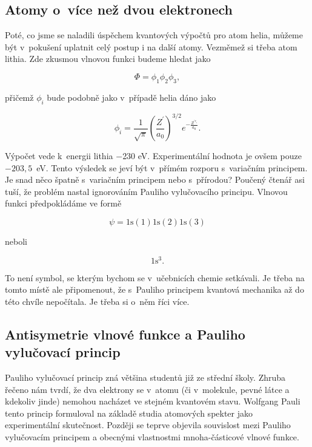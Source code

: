 \subsection{Atomy o~více než dvou elektronech}
Poté, co jsme se naladili úspěchem kvantových výpočtů pro atom helia, můžeme být v~pokušení uplatnit celý postup i na další atomy. Vezměmež si třeba atom lithia. Zde zkusmou vlnovou funkci budeme hledat jako

\begin{equation}
\Phi = \phi_1 \phi_2 \phi_3,
\label{rov:VE-22}
\end{equation}

\noindent přičemž $\phi_i$ bude podobně jako v~případě helia dáno jako

\begin{equation}
\phi_i = \frac{1}{\sqrt{\pi}} \left(\frac{Z^{\prime}}{a_0} \right)^{3/2} e^{-\frac{Z^{\prime r_i}}{a_0}}.
\label{rov:VE-23}
\end{equation}

Výpočet vede k~energii lithia $-$230 eV. Experimentální hodnota je ovšem pouze $-203{,}5$~eV. Tento výsledek se jeví být v~přímém rozporu s~variačním principem. Je snad něco špatně s~variačním principem nebo s~přírodou? Poučený čtenář asi tuší, že problém nastal ignorováním Pauliho vylučovacího  principu. Vlnovou funkci předpokládáme ve formě

\begin{equation}
\psi = 1\mathrm{s}(1) 1\mathrm{s}(2) 1\mathrm{s}(3)
\label{rov:VE-24}
\end{equation}

\noindent neboli

\begin{equation}
1\mathrm{s}^3. \nonumber
\end{equation}

\noindent To není symbol, se kterým bychom se v~učebnicích chemie setkávali. Je třeba na tomto místě ale připomenout, že s~Pauliho principem kvantová mechanika až do této chvíle nepočítala. Je třeba si o~něm říci více.

\subsection{Antisymetrie vlnové funkce a Pauliho vylučovací princip}

Pauliho vylučovací princip zná většina studentů již ze střední školy. Zhruba řečeno nám tvrdí, že dva elektrony se v~atomu (či v~molekule, pevné látce a kdekoliv jinde) nemohou nacházet ve stejném kvantovém stavu. Wolfgang Pauli tento princip formuloval na základě studia atomových spekter jako experimentální skutečnost. Později se teprve objevila souvislost mezi Pauliho vylučovacím principem a obecnými vlastnostmi mnoha-částicové vlnové funkce.    

